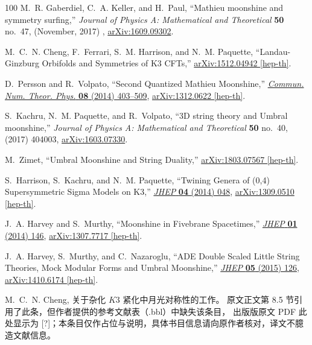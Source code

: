 \documentclass[11pt,a4paper,fontset=windows]{ctexart}
\numberwithin{equation}{section}
\begin{document}
\begin{thebibliography}{100}
M.~R. Gaberdiel, C.~A. Keller, and H.~Paul, ``Mathieu moonshine and symmetry
  surfing,'' {\em Journal of Physics A: Mathematical and Theoretical}
  {\bfseries 50} no.~47, (November, 2017) ,
  \href{http://arxiv.org/abs/arXiv:1609.09302}{{\ttfamily arXiv:1609.09302}}.

M.~C.~N. Cheng, F.~Ferrari, S.~M. Harrison, and N.~M. Paquette,
  ``{Landau-Ginzburg Orbifolds and Symmetries of K3 CFTs},''
\href{http://arxiv.org/abs/1512.04942}{{\ttfamily arXiv:1512.04942 [hep-th]}}.

D.~Persson and R.~Volpato, ``{Second Quantized Mathieu Moonshine},''
  \href{http://dx.doi.org/10.4310/CNTP.2014.v8.n3.a2}{{\em Commun. Num. Theor.
  Phys.} {\bfseries 08} (2014) 403--509},
\href{http://arxiv.org/abs/1312.0622}{{\ttfamily arXiv:1312.0622 [hep-th]}}.

S.~Kachru, N.~M. Paquette, and R.~Volpato, ``{3D string theory and Umbral
  moonshine},'' {\em Journal of Physics A: Mathematical and Theoretical}
  {\bfseries 50} no.~40, (2017) 404003,
  \href{http://arxiv.org/abs/arXiv:1603.07330}{{\ttfamily arXiv:1603.07330}}.

M.~Zimet, ``{Umbral Moonshine and String Duality},''
\href{http://arxiv.org/abs/1803.07567}{{\ttfamily arXiv:1803.07567 [hep-th]}}.

S.~Harrison, S.~Kachru, and N.~M. Paquette, ``{Twining Genera of (0,4)
  Supersymmetric Sigma Models on K3},''
  \href{http://dx.doi.org/10.1007/JHEP04(2014)048}{{\em JHEP} {\bfseries 04}
  (2014) 048},
\href{http://arxiv.org/abs/1309.0510}{{\ttfamily arXiv:1309.0510 [hep-th]}}.

J.~A. Harvey and S.~Murthy, ``{Moonshine in Fivebrane Spacetimes},''
  \href{http://dx.doi.org/10.1007/JHEP01(2014)146}{{\em JHEP} {\bfseries 01}
  (2014) 146},
\href{http://arxiv.org/abs/1307.7717}{{\ttfamily arXiv:1307.7717 [hep-th]}}.

J.~A. Harvey, S.~Murthy, and C.~Nazaroglu, ``{ADE Double Scaled Little String
  Theories, Mock Modular Forms and Umbral Moonshine},''
  \href{http://dx.doi.org/10.1007/JHEP05(2015)126}{{\em JHEP} {\bfseries 05}
  (2015) 126},
\href{http://arxiv.org/abs/1410.6174}{{\ttfamily arXiv:1410.6174 [hep-th]}}.

M.~C.~N. Cheng, 关于杂化 $K3$ 紧化中月光对称性的工作。
 原文正文第 8.5 节引用了此条，但作者提供的参考文献表（.bbl）中缺失该条目，
  出版版原文 PDF 此处显示为 [?]；本条目仅作占位与说明，具体书目信息请向原作者核对，译文不臆造文献信息。

\end{thebibliography}\endgroup
\end{document}
